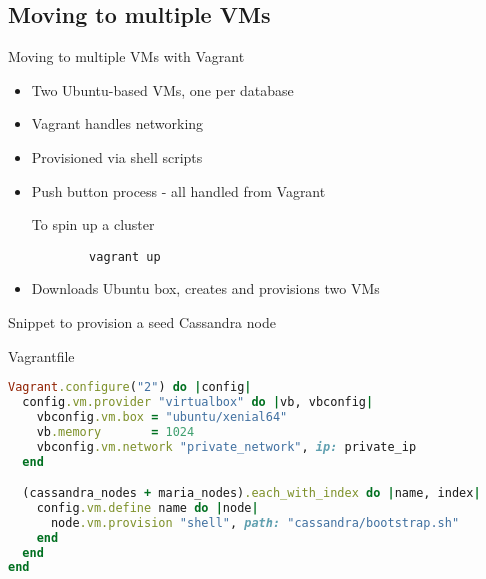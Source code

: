 \documentclass[xcolor=dvipsnames]{beamer}
\begin{document}
\subsection{Moving to multiple VMs}
\begin{frame}[fragile]{Moving to multiple VMs with Vagrant}
  \begin{itemize}
    \item Two Ubuntu-based VMs, one per database
    \item Vagrant handles networking
    \item Provisioned via shell scripts
    \item Push button process - all handled from Vagrant
    \pause
    \begin{block}{To spin up a cluster}
      \begin{verbatim}
        vagrant up\end{verbatim}
    \end{block}
    \item Downloads Ubuntu box, creates and provisions two VMs
  \end{itemize}
\end{frame}

\begin{frame}[fragile]{Snippet to provision a seed Cassandra node}
  \begin{block}{Vagrantfile}
  \begin{lstlisting}[language=ruby,
                     columns=fullflexible,
                     basicstyle=\ttfamily\small,
                     keywordstyle=\color{blue}\ttfamily,
                     stringstyle=\color{red}\ttfamily,
                     commentstyle=\color{green}\ttfamily,
                     breaklines=true]
Vagrant.configure("2") do |config|
  config.vm.provider "virtualbox" do |vb, vbconfig|
    vbconfig.vm.box = "ubuntu/xenial64"
    vb.memory       = 1024
    vbconfig.vm.network "private_network", ip: private_ip
  end

  (cassandra_nodes + maria_nodes).each_with_index do |name, index|
    config.vm.define name do |node|
      node.vm.provision "shell", path: "cassandra/bootstrap.sh"
    end
  end
end
  \end{lstlisting}
  \end{block}
\end{frame}
\end{document}
